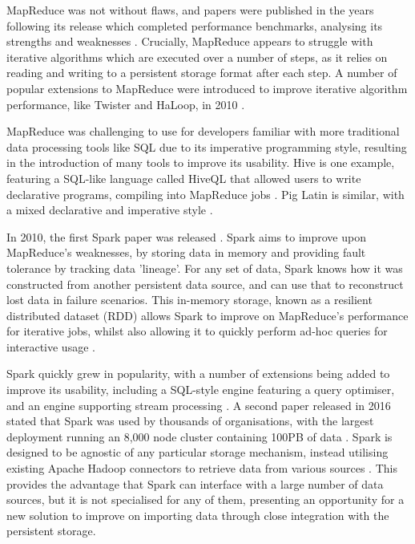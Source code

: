 MapReduce was not without flaws, and papers were published in the years following its release which completed performance benchmarks, analysing its strengths and weaknesses \cite{lee2012parallel}. Crucially, MapReduce appears to struggle with iterative algorithms which are executed over a number of steps, as it relies on reading and writing to a persistent storage format after each step. A number of popular extensions to MapReduce were introduced to improve iterative algorithm performance, like Twister and HaLoop, in 2010 \cite{ekanayake2010twister, bu2010haloop}.

MapReduce was challenging to use for developers familiar with more traditional data processing tools like SQL due to its imperative programming style, resulting in the introduction of many tools to improve its usability. Hive is one example, featuring a SQL-like language called HiveQL that allowed users to write declarative programs, compiling into MapReduce jobs \cite{thusoo2010hive}. Pig Latin is similar, with a mixed declarative and imperative  style \cite{olston2008pig}. 

In 2010, the first Spark paper was released \cite{zaharia2010spark}. Spark aims to improve upon MapReduce's weaknesses, by storing data in memory and providing fault tolerance by tracking data 'lineage'. For any set of data, Spark knows how it was constructed from another persistent data source, and can use that to reconstruct lost data in failure scenarios. This in-memory storage, known as a resilient distributed dataset (RDD) allows Spark to improve on MapReduce's performance for iterative jobs, whilst also allowing it to quickly perform ad-hoc queries for interactive usage \cite{zaharia2012rdd}.

Spark quickly grew in popularity, with a number of extensions being added to improve its usability, including a SQL-style engine featuring a query optimiser, and an engine supporting stream processing \cite{armbrust2015sparksql, armbrust2018sparkstreaming}. A second paper released in 2016 stated that Spark was used by thousands of organisations, with the largest deployment running an 8,000 node cluster containing 100PB of data \cite{zaharia2016spark}. Spark is designed to be agnostic of any particular storage mechanism, instead utilising existing Apache Hadoop connectors to retrieve data from various sources \cite{rddprogrammingguide}. This provides the advantage that Spark can interface with a large number of data sources, but it is not specialised for any of them, presenting an opportunity for a new solution to improve on importing data through close integration with the persistent storage.

